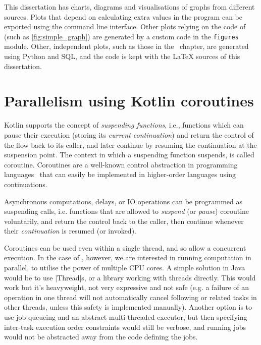 This dissertation has charts, diagrams and visualisations of graphs from different sources.
Plots that depend on calculating extra values in the \graffs program can be exported using the command line interface.
Other plots relying on the code of \graffs (such as \cref{fig:simple_graph}) are generated by a custom code in the \texttt{figures} module.
Other, independent plots, such as those in the~ chapter, are generated using Python and SQL, and the code is kept with the LaTeX sources of this dissertation.


\section{Parallelism using Kotlin coroutines}
\label{sec:kotlin_coroutines}

Kotlin supports the concept of \textsl{suspending functions}, i.e., functions which can pause their execution (storing its \textsl{current continuation}) and return the control of the flow back to its caller, and later continue by resuming the continuation at the suspension point.
The context in which a suspending function suspends, is called coroutine.
Coroutines are a well-known control abstraction in programming languages~\cite{MouraRevisitingCoroutines2009} that can easily be implemented in higher-order languages using continuations\cite{HaynesContinuationsCoroutines1984}.

Asynchronous computations, delays, or IO operations can be programmed as suspending calls, i.e. functions that are allowed to \textsl{suspend} (or \textsl{pause}) coroutine voluntarily, and return the control back to the caller, then continue whenever their \textsl{continuation} is resumed (or invoked).

Coroutines can be used even within a single thread, and so allow a concurrent execution.
In the case of \graffs, however, we are interested in running computation in parallel, to utilise the power of multiple CPU cores.
A simple solution in Java would be to use |Thread|s, or a library working with threads directly.
This would work but it's heavyweight, not very expressive and not safe (e.g. a failure of an operation in one thread will not automatically cancel following or related tasks in other threads, unless this safety is implemented manually).
Another option is to use job queueing and an abstract multi-threaded executor, but then specifying inter-task execution order constraints would still be verbose, and running jobs would not be abstracted away from the code defining the jobs.

